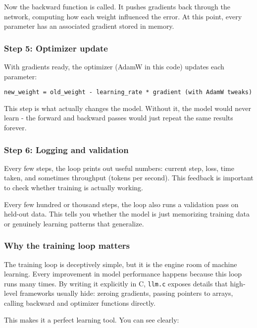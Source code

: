 \documentclass[
  letterpaper,
  DIV=11,
  numbers=noendperiod]{scrreprt}
\begin{document}
Now the backward function is called. It pushes gradients back through
the network, computing how each weight influenced the error. At this
point, every parameter has an associated gradient stored in memory.

\subsubsection{Step 5: Optimizer update}\label{step-5-optimizer-update}

With gradients ready, the optimizer (AdamW in this code) updates each
parameter:

\begin{verbatim}
new_weight = old_weight - learning_rate * gradient (with AdamW tweaks)
\end{verbatim}

This step is what actually changes the model. Without it, the model
would never learn - the forward and backward passes would just repeat
the same results forever.

\subsubsection{Step 6: Logging and
validation}\label{step-6-logging-and-validation}

Every few steps, the loop prints out useful numbers: current step, loss,
time taken, and sometimes throughput (tokens per second). This feedback
is important to check whether training is actually working.

Every few hundred or thousand steps, the loop also runs a validation
pass on held-out data. This tells you whether the model is just
memorizing training data or genuinely learning patterns that generalize.

\subsubsection{Why the training loop
matters}\label{why-the-training-loop-matters}

The training loop is deceptively simple, but it is the engine room of
machine learning. Every improvement in model performance happens because
this loop runs many times. By writing it explicitly in C, \texttt{llm.c}
exposes details that high-level frameworks usually hide: zeroing
gradients, passing pointers to arrays, calling backward and optimizer
functions directly.

This makes it a perfect learning tool. You can see clearly:
\end{document}
